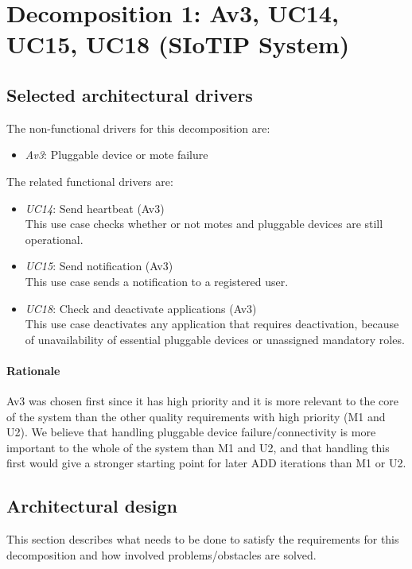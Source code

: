 \section{Decomposition 1: Av3, UC14, UC15, UC18 (SIoTIP System)}


\subsection{Selected architectural drivers}
    The non-functional drivers for this decomposition are:
    \begin{itemize}
    	\item \emph{Av3}: Pluggable device or mote failure
    \end{itemize}

    The related functional drivers are:
    \begin{itemize}
    	\item \emph{UC14}: Send heartbeat (Av3) \\
              This use case checks whether or not motes and pluggable devices
              are still operational.
    	\item \emph{UC15}: Send notification (Av3) \\
              This use case sends a notification to a registered user.
    	\item \emph{UC18}: Check and deactivate applications (Av3) \\
              This use case deactivates any application that requires deactivation,
              because of unavailability of essential pluggable devices
              or unassigned mandatory roles.
    \end{itemize}

    \paragraph{Rationale}
        Av3 was chosen first since it has high priority and it is more relevant to
        the core of the system than the other quality requirements with high
        priority (M1 and U2).
        We believe that handling pluggable device failure/connectivity is
        more important to the whole of the system than M1 and U2, and that
        handling this first would give a stronger starting point for later ADD iterations
        than M1 or U2.


\subsection{Architectural design}\label{sec:architectural-design}
    This section describes what needs to be done to satisfy the requirements for
    this decomposition and how involved problems/obstacles are solved.

